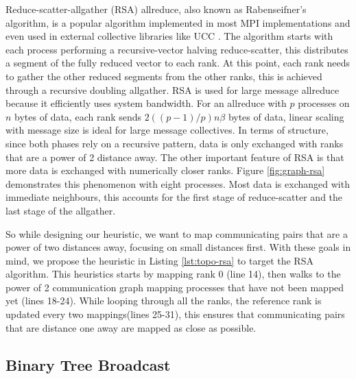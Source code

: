 
\lstset{label = lst:topo-rsa}
\lstset{caption = Heuristic for rank reordering the reduce-scatter-allgather algorithm.}


Reduce-scatter-allgather (RSA) allreduce, also known as Rabenseifner's algorithm, is a popular algorithm implemented in most MPI implementations and even used in external collective libraries like UCC \cite{UCC}.
The algorithm starts with each process performing a recursive-vector halving reduce-scatter, this distributes a segment of the fully reduced vector to each rank.
At this point, each rank needs to gather the other reduced segments from the other ranks, this is achieved through a recursive doubling allgather.
RSA is used for large message allreduce because it efficiently uses system bandwidth.
For an allreduce with $p$ processes on $n$ bytes of data, each rank sends $2((p-1)/p)n\beta$ bytes of data, linear scaling with message size is ideal for large message collectives.
In terms of structure, since both phases rely on a recursive pattern, data is only exchanged with ranks that are a power of 2 distance away.
The other important feature of RSA is that more data is exchanged with numerically closer ranks.
Figure \ref{fig:graph-rsa} demonstrates this phenomenon with eight processes.
Most data is exchanged with immediate neighbours, this accounts for the first stage of reduce-scatter and the last stage of the allgather.

So while designing our heuristic, we want to map communicating pairs that are a power of two distances away, focusing on small distances first.
With these goals in mind, we propose the heuristic in Listing \ref{lst:topo-rsa} to target the RSA algorithm.
This heuristics starts by mapping rank 0 (line 14), then walks to the power of 2 communication graph mapping processes that have not been mapped yet (lines 18-24). 
While looping through all the ranks, the reference rank is updated every two mappings(lines 25-31), this ensures that communicating pairs that are distance one away are mapped as close as possible. 

\subsection{Binary Tree Broadcast}


\lstset{label = lst:topo-bintree}
\lstset{caption = Heuristic for rank reordering binary trees.}


